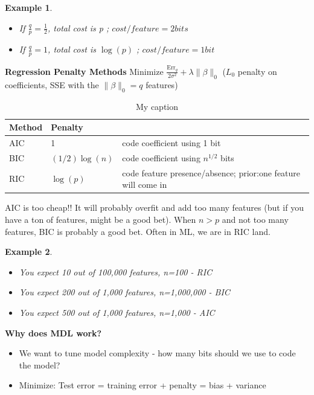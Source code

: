 \documentclass[a4paper]{article}\usepackage[]{graphicx}\usepackage[]{color}
\newtheorem{ex}{Example}[section]
\begin{document}
\begin{ex}
\begin{itemize}
\item If $\frac{q}{p}=\frac{1}{2}$, total cost is p ; $cost/feature = 2 bits$
\item If $\frac{q}{p}=1$, total cost is $\log(p)$ ; $cost/feature = 1 bit$
\end{itemize}
\end{ex}

\textbf{Regression Penalty Methods}
Minimize $\frac{\text{Err}_q}{2\sigma^2} + \lambda \lVert \beta \rVert_0$ ($L_0$ penalty on coefficients, SSE with the $\lVert \beta \rVert_0=q$ features) 

\begin{table}[H]
\centering
\caption{My caption}
\label{my-label}
\begin{tabular}{l|l|l}
Method & Penalty &  \\
\hline
AIC    & 1       & code coefficient using 1 bit  \\
BIC    & $(1/2)\log(n)$ & code coefficient using $n^{1/2}$ bits \\
RIC    &  $\log(p)$ & code feature presence/absence; prior:one feature will come in 
\end{tabular}
\end{table}

AIC is too cheap!! It will probably overfit and add too many features (but if you have a ton of features, might be a good bet). When $n>p$ and not too many features, BIC is probably a good bet. Often in ML, we are in RIC land. 

\begin{ex}
\begin{itemize}
\item You expect 10 out of 100,000 features, n=100  - RIC
\item You expect 200 out of 1,000 features, n=1,000,000 - BIC
\item You expect 500 out of 1,000 features, n=1,000 - AIC
\end{itemize}
\end{ex}

\textbf{Why does MDL work?}
\begin{itemize}
\item We want to tune model complexity - how many bits should we use to code the model?
\item Minimize: Test error = training error + penalty = bias + variance
\end{itemize}
\end{document}
